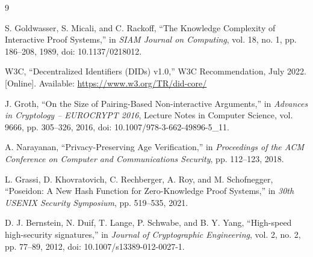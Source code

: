\begin{thebibliography}{9}

S. Goldwasser, S. Micali, and C. Rackoff, ``The Knowledge Complexity of Interactive Proof Systems,'' in \textit{SIAM Journal on Computing}, vol. 18, no. 1, pp. 186--208, 1989, doi: 10.1137/0218012.

W3C, ``Decentralized Identifiers (DIDs) v1.0,'' W3C Recommendation, July 2022. [Online]. Available: \url{https://www.w3.org/TR/did-core/}

J. Groth, ``On the Size of Pairing-Based Non-interactive Arguments,'' in \textit{Advances in Cryptology -- EUROCRYPT 2016}, Lecture Notes in Computer Science, vol. 9666, pp. 305--326, 2016, doi: 10.1007/978-3-662-49896-5\_11.

A. Narayanan, ``Privacy-Preserving Age Verification,'' in \textit{Proceedings of the ACM Conference on Computer and Communications Security}, pp. 112--123, 2018.

L. Grassi, D. Khovratovich, C. Rechberger, A. Roy, and M. Schofnegger, ``Poseidon: A New Hash Function for Zero-Knowledge Proof Systems,'' in \textit{30th USENIX Security Symposium}, pp. 519--535, 2021.

D. J. Bernstein, N. Duif, T. Lange, P. Schwabe, and B. Y. Yang, ``High-speed high-security signatures,'' in \textit{Journal of Cryptographic Engineering}, vol. 2, no. 2, pp. 77--89, 2012, doi: 10.1007/s13389-012-0027-1.

\end{thebibliography}

